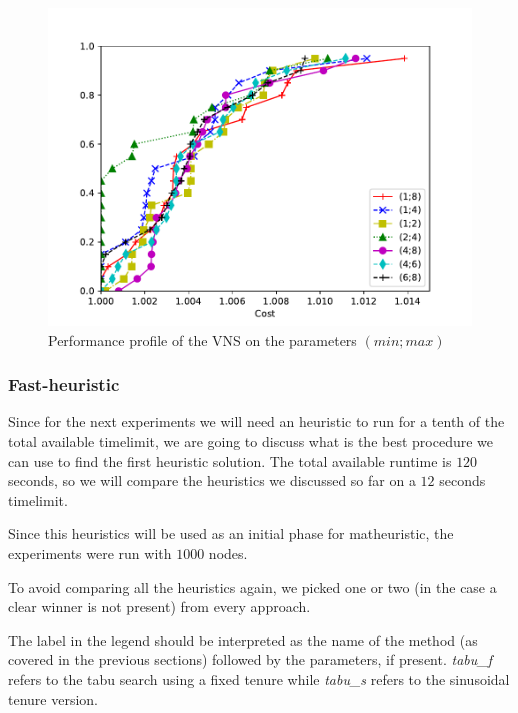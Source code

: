 \documentclass{article}
\begin{document}
\begin{figure}[ht]
        \caption{Performance profile of the VNS on the parameters $\left(min; max\right)$}
        \label{fig:ht_vns}
        \centering
        \includegraphics[width=340pt]{assets/ht_vns.pdf}
\end{figure}

\clearpage
\subsubsection{Fast-heuristic}
Since for the next experiments we will need an heuristic to run for a tenth of
the total available timelimit, we are going to discuss what is the best
procedure we can use to find the first heuristic solution. The total available
runtime is $120$ seconds, so we will compare the heuristics we discussed so far
on a $12$ seconds timelimit.

Since this heuristics will be used as an initial phase for matheuristic,
the experiments were run with $1000$ nodes.

To avoid comparing all the heuristics again, we picked one or two (in the case
a clear winner is not present) from every approach.

The label in the legend should be interpreted as the name of the method (as
covered in the previous sections) followed by the parameters, if present.
\textit{tabu\_f} refers to the tabu search using a fixed tenure while
\textit{tabu\_s} refers to the sinusoidal tenure version.
\end{document}
